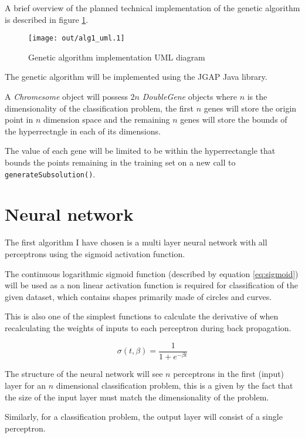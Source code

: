 \documentclass[a4paper]{article}
\begin{document}
A brief overview of the planned technical implementation of the genetic
algorithm is described in figure \ref{fig:alg1_uml}.

\begin{figure}[h!]
  \centering
  \texttt{[image: out/alg1\_uml.1]}
  \caption{Genetic algorithm implementation UML diagram}
  \label{fig:alg1_uml}
\end{figure}

The genetic algorithm will be implemented using the JGAP \cite{jgap} Java
library.

A \textit{Chromesome} object will possess $2n$ \textit{DoubleGene} objects where
$n$ is the dimensionality of the classification problem, the first $n$ genes
will store the origin point in $n$ dimension space and the remaining $n$ genes
will store the bounds of the hyperrectngle in each of its dimensions.

The value of each gene will be limited to be within the hyperrectangle that
bounds the points remaining in the training set on a new call to
\texttt{generateSubsolution()}.

\section{Neural network}

The first algorithm I have chosen is a multi layer neural network with all
perceptrons using the sigmoid activation function.

The continuous logarithmic sigmoid function (described by equation
\ref{eq:sigmoid}) will be used as a non linear activation function is required
for classification of the given dataset, which contains shapes primarily made of
circles and curves.

This is also one of the simplest functions to calculate the derivative of when
recalculating the weights of inputs to each perceptron during back propagation.

\begin{equation}
  \sigma(t, \beta) = \frac{1}{1 + e^{- \beta t}}
  \label{eq:sigmoid}
\end{equation}

The structure of the neural network will see $n$ perceptrons in the first
(input) layer for an $n$ dimensional classification problem, this is a given by
the fact that the size of the input layer must match the dimensionality of the
problem.

Similarly, for a classification problem, the output layer will consist of a
single perceptron.
\end{document}
